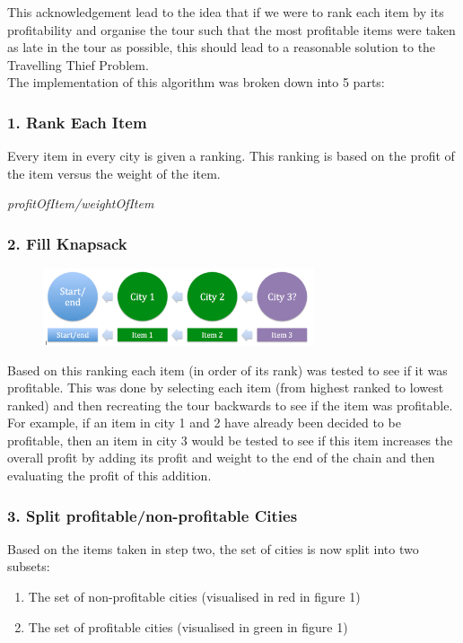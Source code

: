 \documentclass[a4paper,12pt]{article}
\begin{document}
This acknowledgement lead to the idea that if we were to rank each item by its profitability and organise the tour such that the most profitable items were taken as late in the tour as possible, this should lead to a reasonable solution to the Travelling Thief Problem.\\
The implementation of this algorithm was broken down into 5 parts:

\subsubsection*{1. Rank Each Item}
Every item in every city is given a ranking. This ranking is based on the profit of the item versus the weight of the item.
\begin{center}
\emph{profitOfItem/weightOfItem}
\end{center}

\subsubsection*{2. Fill Knapsack}
\begin{figure}[h]
\centering
\includegraphics[width=80mm]{AddItem.png}
\end{figure}
Based on this ranking each item (in order of its rank) was tested to see if it was profitable. This was done by selecting each item (from highest ranked to lowest ranked) and then recreating the tour backwards to see if the item was profitable. For example, if an item in city 1 and 2 have already been decided to be profitable, then an item in city 3 would be tested to see if this item increases the overall profit by adding its profit and weight to the end of the chain and then evaluating the profit of this addition.

\subsubsection*{3. Split profitable/non-profitable Cities}
Based on the items taken in step two, the set of cities is now split into two subsets:

\begin{enumerate}
\item The set of non-profitable cities (visualised in red in figure 1)
\item The set of profitable cities (visualised in green in figure 1)
\end{enumerate}
\end{document}
